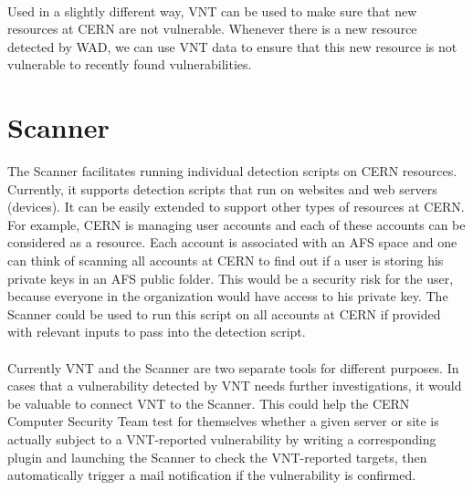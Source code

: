 \paragraph{}
Used in a slightly different way, VNT can be used to make sure that new resources at CERN are not vulnerable. Whenever there is a new resource detected by WAD, we can use VNT data to ensure that this new resource is not vulnerable to recently found vulnerabilities.
\section{Scanner}
The Scanner facilitates running individual detection scripts on CERN resources. Currently, it supports detection scripts that run on websites and web servers (devices). It can be easily extended to support other types of resources at CERN. For example, CERN is managing user accounts and each of these accounts can be considered as a resource. Each account is associated with an AFS space and one can think of scanning all accounts at CERN to find out if a user is storing his private keys in an AFS public folder. This would be a security risk for the user, because everyone in the organization would have access to his private key. The Scanner could be used to run this script on all accounts at CERN if provided with relevant inputs to pass into the detection script.
\paragraph{}
Currently VNT and the Scanner are two separate tools for different purposes. In cases that a vulnerability detected by VNT needs further investigations, it would be valuable to connect VNT to the Scanner. This could help the CERN Computer Security Team test for themselves whether a given server or site is actually subject to a VNT-reported vulnerability by writing a corresponding plugin and launching the Scanner to check the VNT-reported targets, then automatically trigger a mail notification if the vulnerability is confirmed.